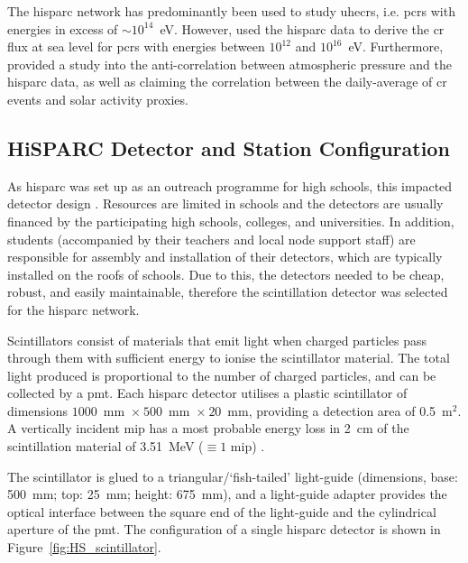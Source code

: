 The \gls{hisparc} network has predominantly been used to study \glspl{uhecr}, i.e. \glspl{pcr} with energies in excess of $\sim$$10^{14}$~eV. However, \citet{van_dam_probing_2020} used the \gls{hisparc} data to derive the \gls{cr} flux at sea level for \glspl{pcr} with energies between $10^{12}$ and $10^{16}$~eV. Furthermore, \citet{fan_analysis_2018} provided a study into the anti-correlation between atmospheric pressure and the \gls{hisparc} data, as well as claiming the correlation between the daily-average of \gls{cr} events and solar activity proxies.



\subsection{HiSPARC Detector and Station Configuration}

As \gls{hisparc} was set up as an outreach programme for high schools, this impacted detector design \citep{fokkema_hisparc_2012, van_dam_hisparc_2020}. Resources are limited in schools and the detectors are usually financed by the participating high schools, colleges, and universities. In addition, students (accompanied by their teachers and local node support staff) are responsible for assembly and installation of their detectors, which are typically installed on the roofs of schools. Due to this, the detectors needed to be cheap, robust, and easily maintainable, therefore the scintillation detector was selected for the \gls{hisparc} network.

Scintillators consist of materials that emit light when charged particles pass through them with sufficient energy to ionise the scintillator material. The total light produced is proportional to the number of charged particles, and can be collected by a \gls{pmt}. Each \gls{hisparc} detector utilises a plastic scintillator of dimensions $1000$~mm~$\times~500$~mm~$\times~20$~mm, providing a detection area of 0.5~$\mathrm{m}^2$. A vertically incident \gls{mip} has a most probable energy loss in 2~cm of the scintillation material of 3.51~MeV ($\equiv 1$ \gls{mip}) \citep{van_dam_hisparc_2020}.

The scintillator is glued to a triangular/`fish-tailed' light-guide (dimensions, base: 500~mm; top: 25~mm; height: 675~mm), and a light-guide adapter provides the optical interface between the square end of the light-guide and the cylindrical aperture of the \gls{pmt}. The configuration of a single \gls{hisparc} detector is shown in Figure~\ref{fig:HS_scintillator}. 

